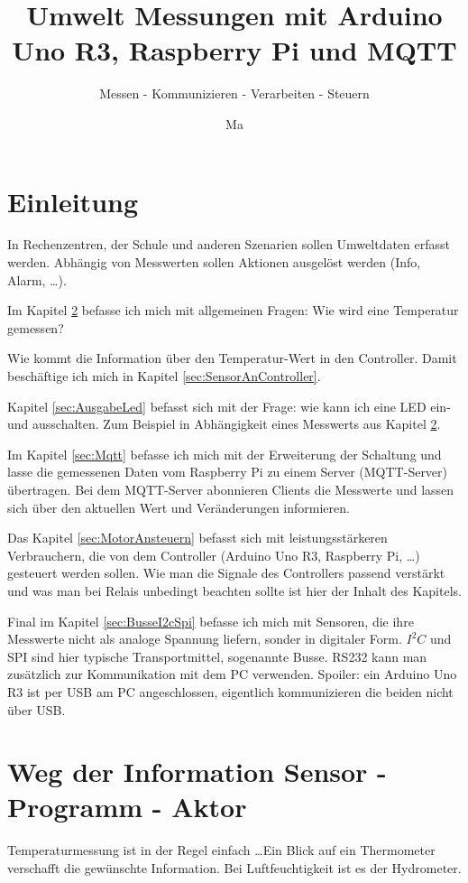 \documentclass[paper = a4]{scrreprt}
\title{Umwelt Messungen mit Arduino Uno R3, Raspberry Pi und MQTT}
\subtitle{Messen - Kommunizieren - Verarbeiten - Steuern}
\author{Ma}
\begin{document}
\maketitle

\tableofcontents
\chapter{Einleitung}
In Rechenzentren, der Schule und anderen Szenarien sollen Umweltdaten erfasst werden. Abhängig von Messwerten sollen Aktionen ausgelöst werden (Info, Alarm, \dots).

Im Kapitel \ref{sec:Sensor} befasse ich mich mit allgemeinen Fragen: Wie wird eine Temperatur gemessen?

Wie kommt die Information über den Temperatur-Wert in den Controller. Damit beschäftige ich mich in Kapitel \ref{sec:SensorAnController}.

Kapitel \ref{sec:AusgabeLed} befasst sich mit der Frage: wie kann ich eine LED ein- und ausschalten. Zum Beispiel in Abhängigkeit eines Messwerts aus  Kapitel \ref{sec:Sensor}.

Im Kapitel \ref{sec:Mqtt} befasse ich mich mit der Erweiterung der Schaltung und lasse die gemessenen Daten vom Raspberry Pi zu einem Server (MQTT-Server) übertragen. Bei dem MQTT-Server abonnieren Clients die Messwerte und lassen sich über den aktuellen Wert und Veränderungen informieren.

Das Kapitel \ref{sec:MotorAnsteuern} befasst sich mit leistungsstärkeren Verbrauchern, die von dem Controller (Arduino Uno R3, Raspberry Pi, \dots) gesteuert werden sollen. Wie man die Signale des Controllers passend verstärkt und was man bei Relais unbedingt beachten sollte ist hier der Inhalt des Kapitels.

Final im Kapitel \ref{sec:BusseI2cSpi} befasse ich mich mit Sensoren, die ihre Messwerte nicht als analoge Spannung liefern, sonder in digitaler Form. $I^2C$ und SPI sind hier typische Transportmittel, sogenannte Busse. RS232 kann man zusätzlich zur Kommunikation mit dem PC verwenden. Spoiler: ein Arduino Uno R3 ist per USB am PC angeschlossen, eigentlich kommunizieren die beiden nicht über USB.


\chapter{Weg der Information Sensor - Programm - Aktor}
\label{sec:Sensor}
Temperaturmessung ist in der Regel einfach \dots Ein Blick auf ein Thermometer verschafft die gewünschte Information. Bei Luftfeuchtigkeit ist es der Hydrometer.
\end{document}
